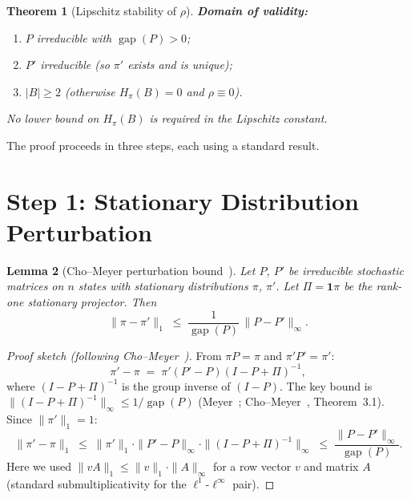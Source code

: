 \documentclass[11pt]{article}
\newtheorem{theorem}{Theorem}
\newtheorem{lemma}[theorem]{Lemma}
\DeclareMathOperator{\gap}{gap}
\begin{document}
\begin{theorem}[Lipschitz stability of $\rho$]
\medskip\noindent
\textbf{Domain of validity:}
\begin{enumerate}
  \item $P$ irreducible with $\gap(P) > 0$;
  \item $P'$ irreducible (so $\pi'$ exists and is unique);
  \item $|B| \ge 2$ (otherwise $H_\pi(B) = 0$ and $\rho \equiv 0$).
\end{enumerate}
No lower bound on $H_\pi(B)$ is required in the Lipschitz constant.
\end{theorem}

The proof proceeds in three steps, each using a standard result.

\section{Step 1: Stationary Distribution Perturbation}

\begin{lemma}[Cho--Meyer perturbation bound~\cite{ChoMeyer2001}]
\label{lem:cho-meyer}
Let $P$, $P'$ be irreducible stochastic matrices on $n$ states with
stationary distributions $\pi$, $\pi'$.  Let
$\Pi = \mathbf{1}\pi$ be the rank-one stationary projector.  Then
\begin{equation}\label{eq:cho-meyer}
  \|\pi - \pi'\|_1 \;\le\;
  \frac{1}{\gap(P)}\,\|P - P'\|_\infty.
\end{equation}
\end{lemma}

\begin{proof}[Proof sketch (following Cho--Meyer~\cite{ChoMeyer2001})]
From $\pi P = \pi$ and $\pi' P' = \pi'$:
\[
  \pi' - \pi \;=\; \pi'(P' - P)(I - P + \Pi)^{-1},
\]
where $(I - P + \Pi)^{-1}$ is the group inverse of $(I - P)$.
The key bound is $\|(I - P + \Pi)^{-1}\|_\infty \le 1/\gap(P)$
(Meyer~\cite{Meyer1975}; Cho--Meyer~\cite{ChoMeyer2001}, Theorem~3.1).
Since $\|\pi'\|_1 = 1$:
\[
  \|\pi' - \pi\|_1
  \;\le\; \|\pi'\|_1 \cdot \|P' - P\|_\infty \cdot \|(I - P + \Pi)^{-1}\|_\infty
  \;\le\; \frac{\|P - P'\|_\infty}{\gap(P)}.
\]
Here we used $\|v A\|_1 \le \|v\|_1 \cdot \|A\|_\infty$ for a row
vector $v$ and matrix $A$ (standard submultiplicativity for the
$\ell^1$-$\ell^\infty$ pair).
\end{proof}
\end{document}
